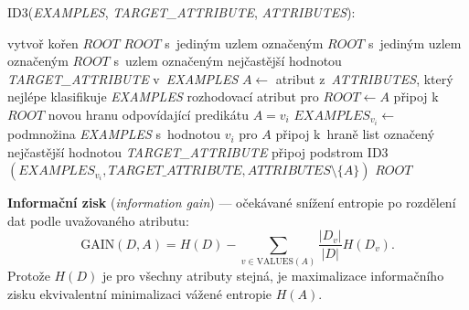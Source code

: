 \documentclass[11pt,a4paper]{article}
\theoremstyle{definition}
\begin{document}
\begin{defbox}
\textsc{ID3}(\emph{EXAMPLES}, \emph{TARGET\_ATTRIBUTE}, \emph{ATTRIBUTES}):
\begin{algorithmic}[1]
\State vytvoř kořen $\mathit{ROOT}$
 \Return $\mathit{ROOT}$ s~jediným uzlem
  označeným \uv{$+$} \EndIf
{} \Return $\mathit{ROOT}$ s~jediným uzlem
  označeným \uv{$-$} \EndIf
{} \Return $\mathit{ROOT}$ s~uzlem označeným
  nejčastější hodnotou \emph{TARGET\_ATTRIBUTE} v~\emph{EXAMPLES} \EndIf
\State $A\gets$ atribut z~\emph{ATTRIBUTES}, který nejlépe klasifikuje \emph{EXAMPLES}
\State rozhodovací atribut pro $\mathit{ROOT}\gets A$
   \State připoj k~$\mathit{ROOT}$ novou hranu odpovídající predikátu $A=v_i$
   \State $\mathit{EXAMPLES}_{v_i}\gets$ podmnožina \emph{EXAMPLES} s~hodnotou $v_i$ pro $A$
      \State připoj k~hraně list označený nejčastější hodnotou \emph{TARGET\_ATTRIBUTE}
   \Else
      \State připoj podstrom \textsc{ID3}$(\mathit{EXAMPLES}_{v_i},
             \mathit{TARGET\_ATTRIBUTE}, \mathit{ATTRIBUTES}\setminus\{A\})$
   \EndIf
\EndFor
\State \Return $\mathit{ROOT}$
\end{algorithmic}

\textbf{Informační zisk} (\emph{information gain}) --- očekávané snížení entropie po rozdělení
dat podle uvažovaného atributu:
\[ \mathrm{GAIN}(D,A)=H(D)-\sum_{v\in \mathrm{VALUES}(A)}\frac{|D_v|}{|D|}H(D_v). \]
Protože $H(D)$ je pro všechny atributy stejná, je maximalizace informačního zisku ekvivalentní
minimalizaci vážené entropie $H(A)$.
\end{defbox}
\end{document}
